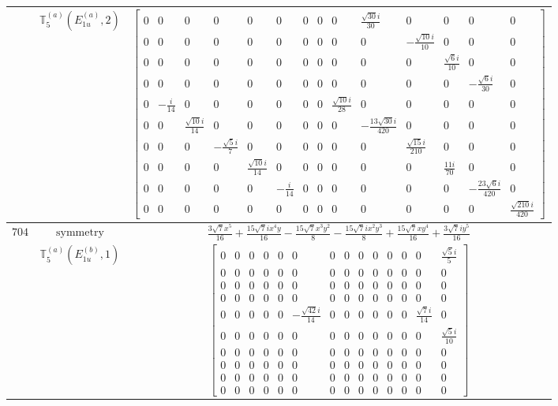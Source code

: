 \documentclass[fleqn,8pt,landscape]{jsarticle}
\begin{document}
\begin{longtable}{ccc}
$  $ & $ \mathbb{T}_{5}^{(a)}(E_{1u}^{(a)},2) $ & $ \begin{bmatrix} 0 & 0 & 0 & 0 & 0 & 0 & 0 & 0 & 0 & \frac{\sqrt{30} i}{30} & 0 & 0 & 0 & 0 \\ 0 & 0 & 0 & 0 & 0 & 0 & 0 & 0 & 0 & 0 & - \frac{\sqrt{10} i}{10} & 0 & 0 & 0 \\ 0 & 0 & 0 & 0 & 0 & 0 & 0 & 0 & 0 & 0 & 0 & \frac{\sqrt{6} i}{10} & 0 & 0 \\ 0 & 0 & 0 & 0 & 0 & 0 & 0 & 0 & 0 & 0 & 0 & 0 & - \frac{\sqrt{6} i}{30} & 0 \\ 0 & - \frac{i}{14} & 0 & 0 & 0 & 0 & 0 & 0 & \frac{\sqrt{10} i}{28} & 0 & 0 & 0 & 0 & 0 \\ 0 & 0 & \frac{\sqrt{10} i}{14} & 0 & 0 & 0 & 0 & 0 & 0 & - \frac{13 \sqrt{30} i}{420} & 0 & 0 & 0 & 0 \\ 0 & 0 & 0 & - \frac{\sqrt{5} i}{7} & 0 & 0 & 0 & 0 & 0 & 0 & \frac{\sqrt{15} i}{210} & 0 & 0 & 0 \\ 0 & 0 & 0 & 0 & \frac{\sqrt{10} i}{14} & 0 & 0 & 0 & 0 & 0 & 0 & \frac{11 i}{70} & 0 & 0 \\ 0 & 0 & 0 & 0 & 0 & - \frac{i}{14} & 0 & 0 & 0 & 0 & 0 & 0 & - \frac{23 \sqrt{6} i}{420} & 0 \\ 0 & 0 & 0 & 0 & 0 & 0 & 0 & 0 & 0 & 0 & 0 & 0 & 0 & \frac{\sqrt{210} i}{420} \end{bmatrix} $ \\ \hline
$ 704 $ & $ \text{symmetry} $ & $ \frac{3 \sqrt{7} x^{5}}{16} + \frac{15 \sqrt{7} i x^{4} y}{16} - \frac{15 \sqrt{7} x^{3} y^{2}}{8} - \frac{15 \sqrt{7} i x^{2} y^{3}}{8} + \frac{15 \sqrt{7} x y^{4}}{16} + \frac{3 \sqrt{7} i y^{5}}{16} $ \\
$  $ & $ \mathbb{T}_{5}^{(a)}(E_{1u}^{(b)},1) $ & $ \begin{bmatrix} 0 & 0 & 0 & 0 & 0 & 0 & 0 & 0 & 0 & 0 & 0 & 0 & 0 & \frac{\sqrt{5} i}{5} \\ 0 & 0 & 0 & 0 & 0 & 0 & 0 & 0 & 0 & 0 & 0 & 0 & 0 & 0 \\ 0 & 0 & 0 & 0 & 0 & 0 & 0 & 0 & 0 & 0 & 0 & 0 & 0 & 0 \\ 0 & 0 & 0 & 0 & 0 & 0 & 0 & 0 & 0 & 0 & 0 & 0 & 0 & 0 \\ 0 & 0 & 0 & 0 & 0 & - \frac{\sqrt{42} i}{14} & 0 & 0 & 0 & 0 & 0 & 0 & \frac{\sqrt{7} i}{14} & 0 \\ 0 & 0 & 0 & 0 & 0 & 0 & 0 & 0 & 0 & 0 & 0 & 0 & 0 & \frac{\sqrt{5} i}{10} \\ 0 & 0 & 0 & 0 & 0 & 0 & 0 & 0 & 0 & 0 & 0 & 0 & 0 & 0 \\ 0 & 0 & 0 & 0 & 0 & 0 & 0 & 0 & 0 & 0 & 0 & 0 & 0 & 0 \\ 0 & 0 & 0 & 0 & 0 & 0 & 0 & 0 & 0 & 0 & 0 & 0 & 0 & 0 \\ 0 & 0 & 0 & 0 & 0 & 0 & 0 & 0 & 0 & 0 & 0 & 0 & 0 & 0 \end{bmatrix} $ \\ \hline

\end{longtable}
\end{document}
